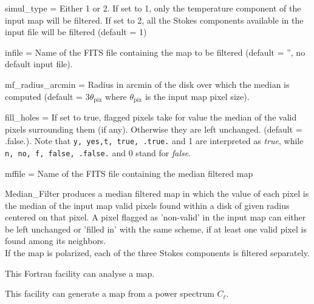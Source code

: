 \begin{qualifiers}
  \begin{qulistwide}{} %
%
    \item[{simul\_type = }]%
 Either 1 or 2. If set to 1, only the temperature component of the
      input map will be filtered. If set to 2, all the Stokes components available
      in the input file will be filtered (default = 1)
%
    \item[{infile = }]%
 Name of the FITS file containing the map to be filtered
      (default = '', no default input file).
%
    \item[{mf\_radius\_arcmin = }]%
 Radius in arcmin of the disk over which the
      median is computed (default = $3\theta_{\mathrm{pix}}$ where $\theta_{\mathrm{pix}}$
      is the input map pixel size).
%
    \item[{fill\_holes = }]%
 If set to true, flagged pixels take for value the median of
      the valid pixels surrounding them (if any). Otherwise they are left
      unchanged.
      (default = .false.). Note that {\tt y, yes,t, true, .true.} and 1 are
      interpreted as {\em true}, while {\tt n, no, f, false, .false.} and 0 stand
      for {\em false}.
%
    \item[{mffile = }]%
 Name of the FITS file containing the median filtered map
%
  \end{qulistwide}
\end{qualifiers}

\begin{codedescription}
{%
Median\_Filter produces a median filtered map in which the value of each pixel
is the median of the input map valid pixels found within a disk of given
  radius centered on that pixel. A pixel flagged as 'non-valid' in the input map
  can either be left unchanged or 'filled in' with the same scheme, if at
  least one valid pixel is found among its neighbors. \\
If the map is polarized, each of the three Stokes components is filtered separately.
}
\end{codedescription}

\begin{support}
  \begin{sulist}{} %
  \item[\htmlref{anafast}{fac:anafast}] This \healpix Fortran facility can
     	       analyse a \healpix map.
  \item[\htmlref{synfast}{fac:synfast}] This \healpix facility can generate a
  \healpix map from a power spectrum $C_\ell$.
		
  \end{sulist}
\end{support}

